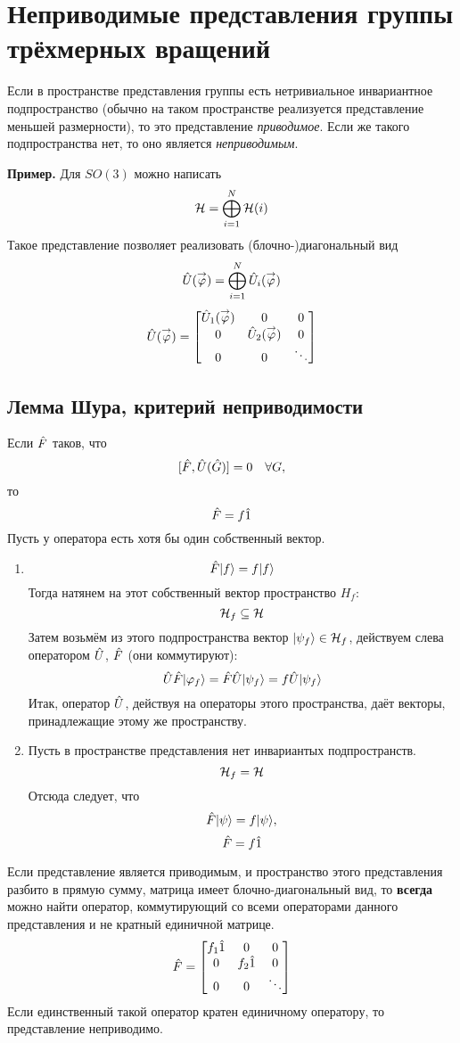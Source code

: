 \section{Неприводимые представления группы трёхмерных вращений}
\Def Если в пространстве представления группы есть нетривиальное инвариантное подпространство (обычно на таком пространстве реализуется представление меньшей размерности), то это представление \emph{приводимое}. Если же такого подпространства нет, то оно является \emph{неприводимым}.

\textbf{Пример.} Для $SO(3)$ можно написать
$$
    \H = \bigoplus_{i=1}^{N} \H(i)
$$
Такое представление позволяет реализовать (блочно-)диагональный вид
$$
    \Hat U(\vec \phi) = \bigoplus_{i=1}^{N} \Hat U_i (\vec \phi)
$$
$$
    \Hat U(\vec \phi) = \begin{bmatrix}
                          \Hat U_1 (\vec \phi) & 0 & 0 \\
                          0 & \Hat U_2 (\vec \phi) & 0 \\
                          0 & 0 & \ddots \\
                        \end{bmatrix}
$$
\subsection{Лемма Шура, критерий неприводимости}
\Lem Если $\Hat F $ таков, что
$$
    [\Hat F, \Hat U (\Hat G)] = 0 \quad \forall G,
$$
то
$$
     \Hat F = f \Hat 1
$$
\Proof Пусть у оператора есть хотя бы один собственный вектор.
\begin{enumerate}
  \item 
  $$
    \Hat F \qu f = f \qu f
  $$
  Тогда натянем на этот собственный вектор пространство $H_f$:
  $$
    \H_f \subseteq \H
  $$
  Затем возьмём из этого подпространства вектор $\qu{\psi_f} \in \H_f$, действуем слева оператором $\Hat U$, $\Hat F$ (они коммутируют):
  $$
    \Hat U \Hat F \qu{\phi_f} = \Hat F \Hat U \qu{\psi_f} = f \Hat U \qu{ \psi_f}
  $$
  Итак, оператор $\Hat U$, действуя на операторы этого пространства, даёт векторы, принадлежащие этому же пространству.
  \item Пусть в пространстве представления нет инвариантых подпространств.
  $$
    \H_f = \H
  $$
  Отсюда следует, что
  $$
    \Hat F \qu{\psi} = f \qu{\psi},
  $$
  $$
    \Hat F = f \Hat 1
  $$
\end{enumerate}
Если представление является приводимым, и пространство этого представления разбито в прямую сумму, матрица имеет блочно-диагональный вид, то \textbf{всегда} можно найти оператор, коммутирующий со всеми операторами данного представления и не кратный единичной матрице.
$$
    \Hat F = \begin{bmatrix}
               f_1 \Hat 1 & 0 & 0 \\
               0 & f_2 \Hat 1 & 0 \\
               0  &  0 & \ddots \\
             \end{bmatrix}
$$ 
Если единственный такой оператор кратен единичному оператору, то представление неприводимо.

